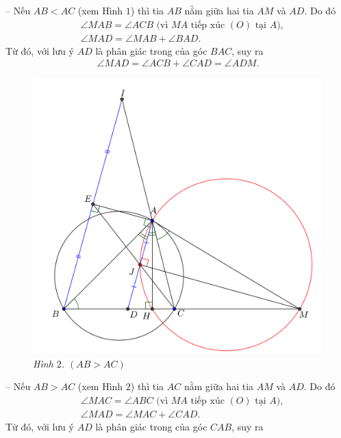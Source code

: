 \begin{multicols}{2}
\begin{figure}[H]
	\end{figure}
	-- Nếu $AB < AC$ (xem Hình $1$) thì tia $AB$ nằm giữa hai tia $AM$ và $AD$. Do đó
	\begin{align*}
		&\angle MAB = \angle ACB \text{ (vì $MA$ tiếp xúc $(O)$ tại $A$),}\\
		&\angle MAD = \angle MAB + \angle BAD.
	\end{align*}
	Từ đó, với lưu ý $AD$ là phân giác trong của góc $BAC$, suy ra
	\begin{align*}
		\angle MAD = \angle ACB + \angle CAD = \angle ADM.
	\end{align*}
	\begin{figure}[H]
		\vspace*{-10pt}
		\centering
		\captionsetup{labelformat= empty, justification=centering}
		\includegraphics[width= 1\linewidth]{P743-Fig1}
		\caption{\small\textit{\color{thachthuctoanhoc}Hình $2$. $(AB > AC)$}}
		\vspace*{-10pt}
	\end{figure}
	-- Nếu $AB > AC$ (xem Hình $2$) thì tia $AC$ nằm giữa hai tia $AM$ và $AD$. Do đó
	\begin{align*}
		&\angle MAC = \angle ABC \text{ (vì $MA$ tiếp xúc $(O)$ tại $A$),}\\
		&\angle MAD = \angle MAC + \angle CAD.
	\end{align*}
	Từ đó, với lưu ý $AD$ là phân giác trong của góc $CAB$, suy ra

\end{multicols}

